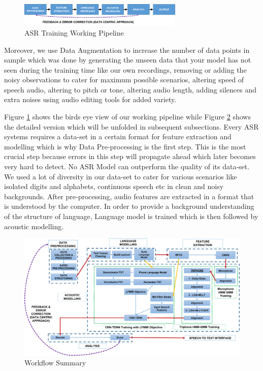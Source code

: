 \documentclass[a4paper, 11pt]{article}
\begin{document}
\begin{figure}[h]
    \centering
    \includegraphics[width=0.7\textwidth]{img/working-pipeline-short.png}
    \caption{ASR Training Working Pipeline}
    \label{fig:working_pipeline_short}
\end{figure}

Moreover, we use Data Augmentation to increase the number of data points in sample which was done by generating the unseen data that your model has not seen during the training time like our own recordings, removing or adding the noisy observations to cater for maximum possible scenarios, altering speed of speech audio, altering to pitch or tone, altering audio length, adding silences and extra noises using audio editing tools \cite{audacity_linux_nodate} for added variety.

Figure \ref{fig:working_pipeline_short} shows the birds eye view of our working pipeline while Figure 
\ref{fig:workflow} shows the detailed version which will be unfolded in subsequent subsections. Every ASR systems requires a data-set in a certain format for feature extraction and modelling which is why Data Pre-processing is the first step. This is the most crucial step because errors in this step will propagate ahead which later becomes very hard to detect. No ASR Model can outperform the quality of its data-set. We used a lot of diversity in our data-set to cater for various scenarios like isolated digits and alphabets, continuous speech etc in clean and noisy backgrounds. After pre-processing, audio features are extracted in a format that is understood by the computer. In order to provide a background understanding of the structure of language, Language model is trained which is then followed by acoustic modelling. 



\begin{figure}[htb]
    \centering
    \includegraphics[width=1.0\textwidth]{img/workflow.png}
    \caption{Workflow Summary}
    \label{fig:workflow}
\end{figure}
\end{document}
